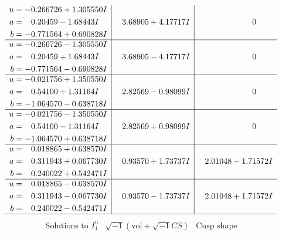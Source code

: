 \documentclass[1p]{elsarticle_modified}
\theoremstyle{definition}
\newcommand{\I}{\sqrt{-1}}
\begin{document}
$$\begin{array}{c|c|c}
\begin{aligned}
u &= -0.266726 + 1.305550 I \\
a &= \phantom{-}0.20459 - 1.68443 I \\
b &= -0.771564 + 0.690828 I\end{aligned}
 & \phantom{-}3.68905 + 4.17717 I & \phantom{-0.000000 } 0 \\ \hline\begin{aligned}
u &= -0.266726 - 1.305550 I \\
a &= \phantom{-}0.20459 + 1.68443 I \\
b &= -0.771564 - 0.690828 I\end{aligned}
 & \phantom{-}3.68905 - 4.17717 I & \phantom{-0.000000 } 0 \\ \hline\begin{aligned}
u &= -0.021756 + 1.350550 I \\
a &= \phantom{-}0.54100 + 1.31164 I \\
b &= -1.064570 - 0.638718 I\end{aligned}
 & \phantom{-}2.82569 - 0.98099 I & \phantom{-0.000000 } 0 \\ \hline\begin{aligned}
u &= -0.021756 - 1.350550 I \\
a &= \phantom{-}0.54100 - 1.31164 I \\
b &= -1.064570 + 0.638718 I\end{aligned}
 & \phantom{-}2.82569 + 0.98099 I & \phantom{-0.000000 } 0 \\ \hline\begin{aligned}
u &= \phantom{-}0.018865 + 0.638570 I \\
a &= \phantom{-}0.311943 + 0.067730 I \\
b &= \phantom{-}0.240022 + 0.542471 I\end{aligned}
 & \phantom{-}0.93570 + 1.73737 I & \phantom{-}2.01048 - 1.71572 I \\ \hline\begin{aligned}
u &= \phantom{-}0.018865 - 0.638570 I \\
a &= \phantom{-}0.311943 - 0.067730 I \\
b &= \phantom{-}0.240022 - 0.542471 I\end{aligned}
 & \phantom{-}0.93570 - 1.73737 I & \phantom{-}2.01048 + 1.71572 I\\
 \hline 
 \end{array}$$\newpage$$\begin{array}{c|c|c}  
\text{Solutions to }I^u_{1}& \I (\text{vol} + \sqrt{-1}CS) & \text{Cusp shape}\\

\end{array}$$
\end{document}
